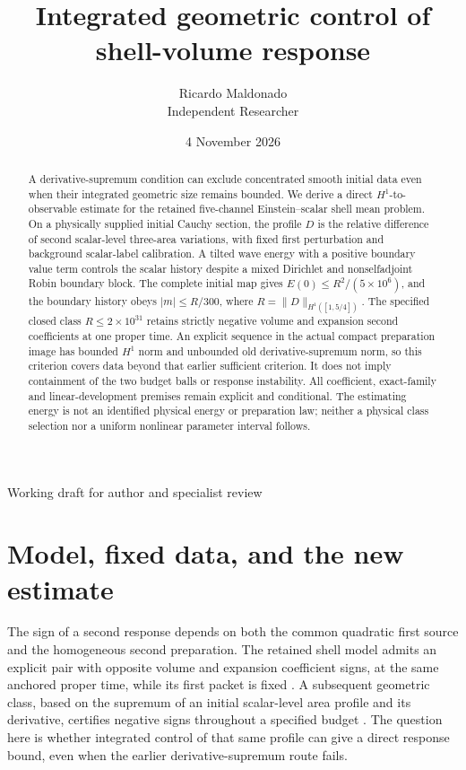 \documentclass[11pt]{article}
\title{Integrated geometric control of shell-volume response}
\author{Ricardo Maldonado\\\small Independent Researcher}
\date{4 November 2026}
\newcommand{\norm}[1]{\lVert #1\rVert}
\begin{document}
\maketitle
\begin{center}\small Working draft for author and specialist review\end{center}
\begin{abstract}
A derivative-supremum condition can exclude concentrated smooth initial
data even when their integrated geometric size remains bounded. We derive
a direct $H^1$-to-observable estimate for the retained five-channel
Einstein--scalar shell mean problem. On a physically supplied initial
Cauchy section, the profile $D$ is the relative difference of second
scalar-level three-area variations, with fixed first perturbation and
background scalar-label calibration. A tilted wave energy with a positive
boundary value term controls the scalar history despite a mixed
Dirichlet and nonselfadjoint Robin boundary block. The complete initial
map gives $E(0)\le R^2/(5\times10^6)$, and the boundary history obeys
$|m|\le R/300$, where $R=\norm{D}_{H^1([1,5/4])}$. The specified closed
class $R\le2\times10^{31}$ retains strictly negative volume and expansion
second coefficients at one proper time. An explicit sequence in the
actual compact preparation image has bounded $H^1$ norm and unbounded
old derivative-supremum norm, so this criterion covers data beyond that
earlier sufficient criterion. It does not imply containment of the two
budget balls or response instability. All coefficient, exact-family and
linear-development premises remain explicit and conditional. The estimating
energy is not an identified physical energy or preparation law; neither a
physical class selection nor a uniform nonlinear parameter interval follows.
\end{abstract}

\section{Model, fixed data, and the new estimate}

The sign of a second response depends on both the common quadratic first
source and the homogeneous second preparation. The retained shell model
admits an explicit pair with opposite volume and expansion coefficient
signs, at the same anchored proper time, while its first packet is fixed
\cite{preparation}. A subsequent geometric class, based on the supremum of
an initial scalar-level area profile and its derivative, certifies negative
signs throughout a specified budget \cite{intrinsic}. The question here is
whether integrated control of that same profile can give a direct response
bound, even when the earlier derivative-supremum route fails.
\end{document}
